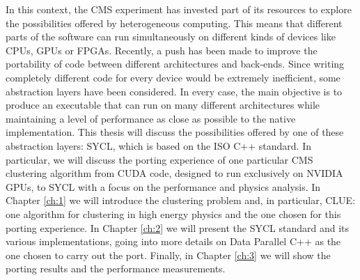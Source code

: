 In this context, the CMS experiment has invested part of its resources to explore the possibilities offered by heterogeneous computing. This means that different parts of the software can run simultaneously on different kinds of devices like CPUs, GPUs or FPGAs. Recently, a push has been made to improve the portability of code between different architectures and back-ends. Since writing completely different code for every device would be extremely inefficient, some abstraction layers have been considered. In every case, the main objective is to produce an executable that can run on many different architectures while maintaining a level of performance as close as possible to the native implementation. \newline
This thesis will discuss the possibilities offered by one of these abstraction layers: SYCL, which is based on the ISO C++ standard. In particular, we will discuss the porting experience of one particular CMS clustering algorithm from CUDA code, designed to run exclusively on NVIDIA GPUs, to SYCL with a focus on the performance and physics analysis. \newline
In Chapter \ref{ch:1} we will introduce the clustering problem and, in particular, CLUE: one algorithm for clustering in high energy physics and the one chosen for this porting experience. 
In Chapter \ref{ch:2} we will present the SYCL standard and its various implementations, going into more details on Data Parallel C++ as the one chosen to carry out the port. Finally, in Chapter \ref{ch:3} we will show the porting results and the performance measurements.

